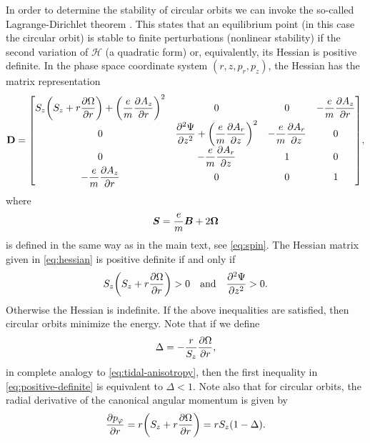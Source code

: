 \documentclass[aps,pre,notitlepage,amsmath,amssymb,amsfonts,nobibnotes,nofootinbib,superscriptaddress]{revtex4-1}
\begin{document}
In order to determine the stability of circular orbits we can invoke the
so-called Lagrange-Dirichlet theorem \citep[see e.g.][and references
therein]{Krechetnikov2007}. This states that an equilibrium point (in this
case the circular orbit) is stable to finite perturbations (nonlinear
stability) if the second variation of $\mathcal{H}$ (a quadratic form) or,
equivalently, its Hessian is positive definite. In the phase space coordinate
system $(r,z,p_r,p_z)$, the Hessian has the matrix representation
\begingroup
\renewcommand*{\arraystretch}{2.5}
\begin{equation}
  \label{eq:hessian}
  \mathbf{D} =
  \begin{bmatrix}
    \displaystyle S_z\left(S_z + r\pder{\Omega}{r}\right)
    + {\left(\cm\pder{A_z}{r}\right)}^2 & 0 & 0
    & \displaystyle -\cm\pder{A_z}{r}
    \\
    0 & \displaystyle\pdder{\Psi}{z} + {\left(\cm\pder{A_r}{z}\right)}^2
    & \displaystyle -\cm\pder{A_r}{z} & 0 \\
    0 & \displaystyle -\cm\pder{A_r}{z} & 1 & 0 \\
    \displaystyle -\cm\pder{A_z}{r} & 0 & 0 & 1
  \end{bmatrix},
\end{equation}
\endgroup
where
\begin{equation}
  \label{eq:global-spin}
  \vec{S} = \cm\vec{B} + 2\vec{\Omega}
\end{equation}
is defined in the same way as in the main text, see \cref{eq:spin}. The
Hessian matrix given in \cref{eq:hessian} is positive definite if and only if
\begin{equation}
  \label{eq:positive-definite}
  S_z\left(S_z + r\pder{\Omega}{r}\right) > 0
  \quad\textrm{and}\quad
  \pdder{\Psi}{z} > 0.
\end{equation}
Otherwise the Hessian is indefinite. If the above inequalities are satisfied,
then circular orbits minimize the energy. Note that if we define
\begin{equation}
  \label{eq:global-tidal-anisotropy}
  \Delta = -\frac{r}{S_z}\pder{\Omega}{r},
\end{equation}
in complete analogy to \cref{eq:tidal-anisotropy}, then the first inequality
in \cref{eq:positive-definite} is equivalent to $\Delta<1$. Note also that for
circular orbits, the radial derivative of the canonical angular momentum is
given by
\begin{equation}
  \label{eq:angular-momentum-gradient}
  \pder{p_\varphi}{r} = r\left(S_z + r\pder{\Omega}{r}\right) =
  rS_z(1 - \Delta).
\end{equation}
\end{document}
